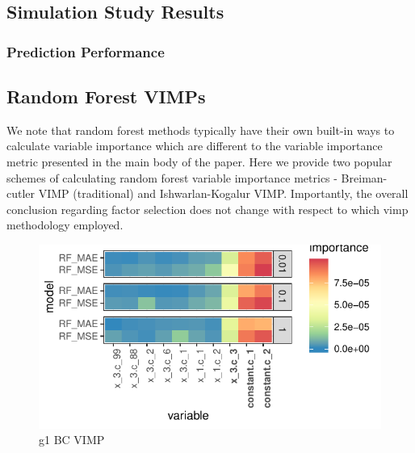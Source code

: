 \documentclass{article}
\begin{document}
\subsection{Simulation Study Results}

\subsubsection{Prediction Performance}



\subsection{Random Forest VIMPs}

We note that random forest methods typically have their own built-in ways to calculate variable importance which are different to the variable importance metric presented in the main body of the paper. Here we provide two popular schemes of calculating random forest variable importance metrics - Breiman-cutler VIMP (traditional) and Ishwarlan-Kogalur VIMP. Importantly, the overall conclusion regarding factor selection does not change with respect to which vimp methodology employed.


\begin{figure}
	\includegraphics[]{../../Results/simulation/graphics/simulation_g1_vimp_bc.pdf}
	\caption{g1 BC VIMP}
\end{figure}
\end{document}
